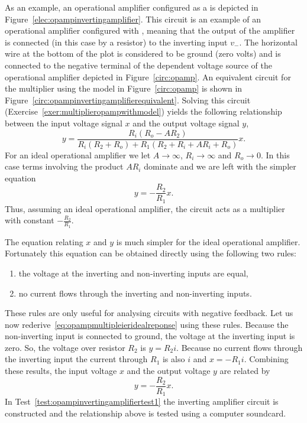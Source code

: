 As an example, an operational amplifier configured as a  is depicted in Figure~\ref{elec:opampinvertingamplifier}.  This circuit is an example of an operational amplifier configured with , meaning that the output of the amplifier is connected (in this case by a resistor) to the inverting input $v_{-}$.  The horizontal wire at the bottom of the plot is considered to be ground (zero volts) and is connected to the negative terminal of the dependent voltage source of the operational amplifier depicted in Figure~\ref{circ:opamp}.  An equivalent circuit for the multiplier using the model in Figure~\ref{circ:opamp} is shown in Figure~\ref{circ:opampinvertingamplifierequivalent}.  Solving this circuit (Exercise~\ref{exer:multiplieropampwithmodel}) yields the following relationship between the input voltage signal $x$ and the output voltage signal $y$,
\begin{equation} \label{eq:intertingopampmodel}
y = \frac{R_i (R_o - A R_2) }{R_i (R_2+R_o)+R_1 (R_2+R_i + A R_i+R_o)}x.
\end{equation}
For an ideal operational amplifier we let $A\to\infty$, $R_i\to\infty$ and $R_o\to 0$.  In this case terms involving the product $A R_i$ dominate and we are left with the simpler equation
\begin{equation}\label{eq:opampmultipleieridealreponse}
y = -\frac{R_2}{R_1} x.
\end{equation}
Thus, assuming an ideal operational amplifier, the circuit acts as a multiplier with constant $-\tfrac{R_2}{R_1}$.  

The equation relating $x$ and $y$ is much simpler for the ideal operational amplifier.  Fortunately this equation can be obtained directly using the following two rules:
\begin{enumerate}
\item the voltage at the inverting and non-inverting inputs are equal,
\item no current flows through the inverting and non-inverting inputs. 
\end{enumerate}
These rules are only useful for analysing circuits with negative feedback.  Let us now rederive~\eqref{eq:opampmultipleieridealreponse} using these rules.  Because the non-inverting input is connected to ground, the voltage at the inverting input is zero.  So, the voltage over resistor $R_2$ is $y = R_2 i$.  Because no current flows through the inverting input the current through $R_1$ is also $i$ and $x = -R_1i$.  Combining these results, the input voltage $x$ and the output voltage $y$ are related by
\[
y = -\frac{R_2}{R_1} x.
\]
In Test~\ref{test:opampinvertingamplifiertest1} the inverting amplifier circuit is constructed and the relationship above is tested using a computer soundcard.

